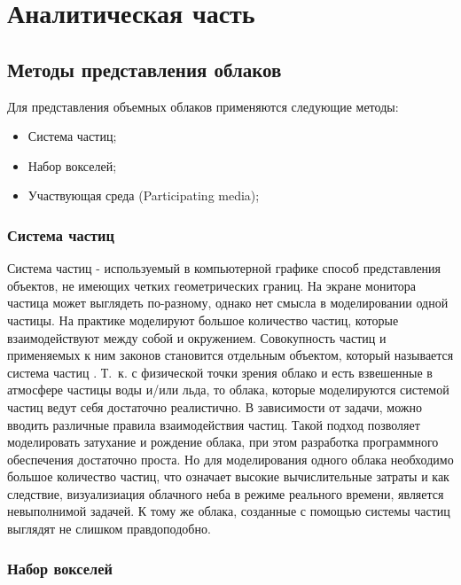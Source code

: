 \chapter{Аналитическая часть}

\section{Методы представления облаков}

Для представления объемных облаков применяются следующие методы:
\begin{itemize}
	\item Система частиц;
	\item Набор вокселей;
	\item Участвующая среда (Participating media);
\end{itemize}

\subsection{Система частиц}

Система частиц - используемый в компьютерной графике способ представления объектов, не имеющих четких геометрических границ.
На экране монитора частица может выглядеть по-разному, однако нет смысла
в моделировании одной частицы. На практике моделируют большое
количество частиц, которые взаимодействуют между собой и
окружением. Совокупность частиц и применяемых к ним законов становится отдельным объектом,
который называется система частиц \cite{particles1}. Т.~к. с физической точки зрения облако и есть взвешенные в атмосфере частицы воды и/или льда, то 
облака, которые моделируются системой частиц ведут себя достаточно реалистично. В зависимости от задачи, можно вводить различные правила взаимодействия частиц.
Такой подход позволяет моделировать затухание и рождение облака, при этом разработка программного обеспечения достаточно проста. Но для моделирования одного облака необходимо большое количество частиц, что означает высокие вычислительные затраты и как следствие, визуализиация облачного неба в режиме реального времени, является невыполнимой задачей. К тому же облака, созданные с помощью системы частиц выглядят не слишком правдоподобно.  

\subsection{Набор вокселей} 

